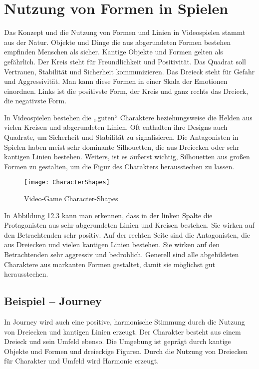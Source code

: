 \section{Nutzung von Formen in Spielen}
Das Konzept und die Nutzung von Formen und Linien in Videospielen stammt aus der Natur. Objekte und Dinge die aus abgerundeten Formen bestehen empfinden Menschen als sicher. Kantige Objekte und Formen gelten als gefährlich. Der Kreis steht für Freundlichkeit und Positivität. Das Quadrat soll Vertrauen, Stabilität und Sicherheit kommunizieren. Das Dreieck steht für Gefahr und Aggressivität. Man kann diese Formen in einer Skala der Emotionen einordnen. Links ist die positivste Form, der Kreis und ganz rechts das Dreieck, die negativste Form. 
\cite{_drawing_basics_and_video_game_art}

In Videospielen bestehen die „guten“ Charaktere beziehungsweise die Helden aus vielen Kreisen und abgerundeten Linien. Oft enthalten ihre Designs auch Quadrate, um Sicherheit und Stabilität zu signalisieren. Die Antagonisten in Spielen haben meist sehr dominante Silhouetten, die aus Dreiecken oder sehr kantigen Linien bestehen. Weiters, ist es äußerst wichtig, Silhouetten aus großen Formen zu gestalten, um die Figur des Charakters herausstechen zu lassen.
\cite{_drawing_basics_and_video_game_art}

\begin{figure}[H]
	\centering
	\texttt{[image: CharacterShapes]}
	\caption{Video-Game Character-Shapes\cite{_drawing_basics_and_video_game_art}}
\end{figure}

In Abbildung 12.3 kann man erkennen, dass in der linken Spalte die Protagonisten aus sehr abgerundeten Linien und Kreisen bestehen. Sie wirken auf den Betrachtenden sehr positiv. Auf der rechten Seite sind die Antagonisten, die aus Dreiecken und vielen kantigen Linien bestehen. Sie wirken auf den Betrachtenden sehr aggressiv und bedrohlich. Generell sind alle abgebildeten Charaktere aus markanten Formen gestaltet, damit sie möglichst gut herausstechen. 
\cite{_drawing_basics_and_video_game_art}

\subsection{Beispiel – Journey}
In Journey wird auch eine positive, harmonische Stimmung durch die Nutzung von Dreiecken und kantigen Linien erzeugt. Der Charakter besteht aus einem Dreieck und sein Umfeld ebenso. Die Umgebung ist geprägt durch kantige Objekte und Formen und dreieckige Figuren. Durch die Nutzung von Dreiecken für Charakter und Umfeld wird Harmonie erzeugt. 
\cite{_drawing_basics_and_video_game_art}
\cite{_farbkontraste_im_gaming}

